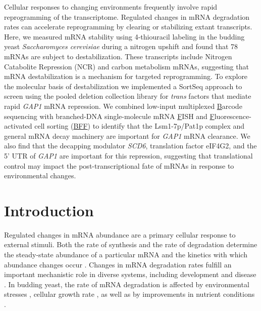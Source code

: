 Cellular responses to changing environments frequently
involve rapid reprogramming of the transcriptome.
Regulated changes in mRNA degradation rates can
accelerate reprogramming by clearing or stabilizing extant transcripts. 
Here, we measured mRNA stability using 4-thiouracil labeling
in the budding yeast \textit{Saccharomyces cerevisiae}
during a nitrogen upshift and found that 78 mRNAs are subject
to destabilization. These transcripts include Nitrogen
Catabolite Repression (NCR) and carbon metabolism mRNAs,
suggesting that mRNA destabilization is a mechanism 
for targeted reprogramming.
To explore the molecular basis of
destabilization we implemented a SortSeq approach to
screen using the pooled deletion collection library
for \textit{trans} factors that mediate rapid \textit{GAP1}
mRNA repression.
We combined low-input multiplexed \underline{B}arcode sequencing 
with branched-DNA single-molecule mRNA \underline{F}ISH and 
\underline{F}luorescence-activated cell sorting (\underline{BFF})
to identify that the Lsm1-7p/Pat1p complex and general mRNA
decay machinery are important for \textit{GAP1} mRNA clearance.
We also find that the decapping modulator \textit{SCD6}, translation
factor eIF4G2, and the 5' UTR of \textit{GAP1}
are important for this repression, 
suggesting that translational control may impact the 
post-transcriptional fate of mRNAs in response to 
environmental changes.

\section{Introduction}

Regulated changes in mRNA abundance are a primary cellular response
to external stimuli.
Both the rate of synthesis and the rate of degradation determine the
steady-state abundance of a particular mRNA and the kinetics
with which abundance changes occur
\parencite{hargrove1989role,perez2013eukaryotic}. 
Changes in mRNA degradation rates fulfill an important 
mechanistic role in diverse systems, including 
development \parencite{alonso2012complex,west2018developmental} and disease
\parencite{aghib19903}.
In budding yeast, the rate of
mRNA degradation is affected by environmental stresses
\parencite{canadell2015impact}, cellular growth rate
\parencite{garcia2016growth}, as well as by improvements in 
nutrient conditions \parencite{scheffler1998control}.

